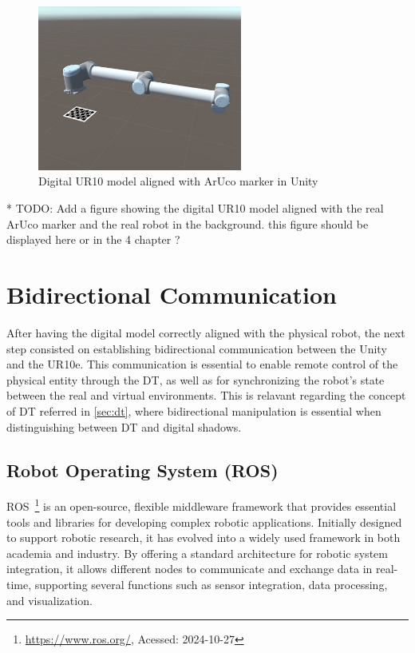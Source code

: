 \begin{figure}[h]
    \centering
    \includegraphics[width=0.6\textwidth]{figs/robot_marker_unity.jpg}
    \caption{Digital UR10 model aligned with ArUco marker in Unity}
    \label{f:ur10_marker_unity}
\end{figure}

* TODO: Add a figure showing the digital UR10 model aligned with the real ArUco marker and the real robot in the background.
this figure should be displayed here or in the 4 chapter ?

\section{Bidirectional Communication}

After having the digital model correctly aligned with the physical robot, the next step consisted on establishing bidirectional communication between the Unity and the UR10e. This communication is essential to enable remote control of the physical entity through the \ac{DT}, as well as for synchronizing the robot's state between the real and virtual environments. This is relavant regarding the concept of \ac{DT} referred in \ref{sec:dt}, where bidirectional manipulation is essential when distinguishing between \ac{DT} and digital shadows. 

\subsection{Robot Operating System (ROS)}

\ac{ROS}~\footnote{\url{https://www.ros.org/}, Acessed: 2024-10-27} is an open-source, flexible middleware framework that provides essential tools and libraries for developing complex robotic applications. Initially designed to support robotic research, it has evolved into a widely used framework in both academia and industry. By offering a standard architecture for robotic system integration, it allows different nodes to communicate and exchange data in real-time, supporting several functions such as sensor integration, data processing, and visualization.


